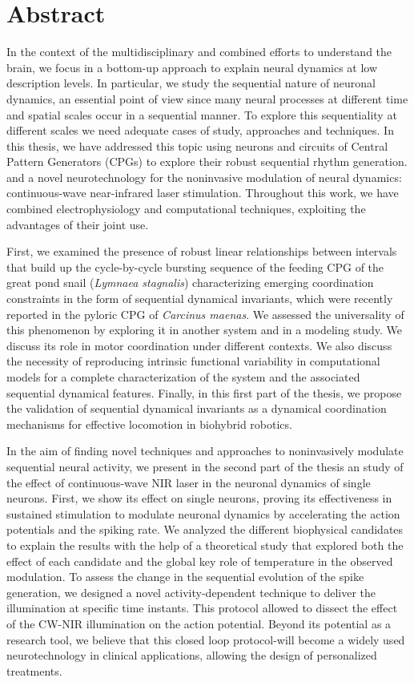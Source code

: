 \chapter*{Abstract}
In the context of the multidisciplinary and combined efforts to understand the brain, we focus in a bottom-up approach to explain neural dynamics at low description 
 levels. In particular, we study the sequential nature of neuronal dynamics, an essential point of view since many neural processes at different time and spatial scales occur in a sequential manner. To explore this sequentiality at different scales we need adequate cases of study, approaches and techniques. In this thesis, we have addressed this topic using neurons and circuits of Central Pattern Generators (CPGs) to explore their robust sequential rhythm generation. and a novel neurotechnology for the noninvasive modulation of neural dynamics: continuous-wave near-infrared laser stimulation. Throughout this work, we have combined electrophysiology and computational techniques, exploiting the advantages of their joint use. 

First, we examined the presence of robust linear relationships between intervals that build up the cycle-by-cycle bursting sequence of the feeding CPG of the great pond snail (\textit{Lymnaea stagnalis}) characterizing emerging coordination constraints in the form of sequential dynamical invariants, which were recently reported in the pyloric CPG of \textit{Carcinus maenas}. We assessed the universality of this phenomenon by exploring it in another system and in a modeling study. We discuss its role in motor coordination under different contexts. We also discuss the necessity of reproducing intrinsic functional variability in computational models for a complete characterization of the system and the associated sequential dynamical features. Finally, in this first part of the thesis, we propose  the validation of  sequential dynamical invariants as a dynamical coordination mechanisms for  effective locomotion in biohybrid robotics. 

In the aim of finding novel techniques and approaches to noninvasively modulate sequential neural activity, we present in the second part of the thesis an study of the effect of continuous-wave NIR laser in the neuronal dynamics of single neurons. First, we show its effect on single neurons, proving its effectiveness in sustained stimulation to modulate neuronal dynamics by accelerating the action potentials and the spiking rate. We analyzed the different biophysical candidates to  explain the  results with the help of a theoretical study  that explored both the effect of each candidate and the global key role of temperature in the observed modulation. To assess the change in the sequential evolution of the spike generation,  we designed a novel activity-dependent technique to deliver the illumination at specific time instants. This protocol allowed to dissect the effect of the CW-NIR illumination on the action potential. Beyond its potential as a research tool, we believe that this closed loop protocol-will become a widely used neurotechnology in clinical applications, allowing the design of personalized treatments. 


